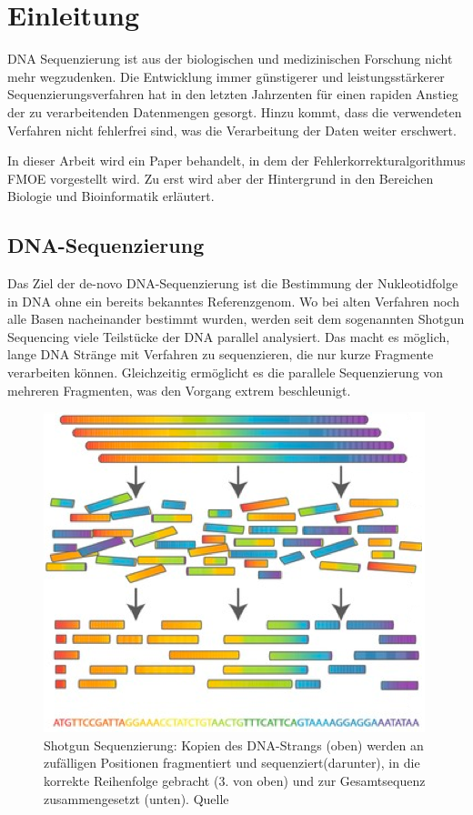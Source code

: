 \chapter{Einleitung}
\label{ch:einleitung}

DNA Sequenzierung ist aus der biologischen und medizinischen Forschung nicht mehr wegzudenken.
Die Entwicklung immer günstigerer und leistungsstärkerer Sequenzierungsverfahren hat in den letzten Jahrzenten für einen rapiden Anstieg der zu verarbeitenden Datenmengen gesorgt.
Hinzu kommt, dass die verwendeten Verfahren nicht fehlerfrei sind, was die Verarbeitung der Daten weiter erschwert.

In dieser Arbeit wird ein Paper \cite{Huang} \cite{Huang2} behandelt, in dem der Fehlerkorrekturalgorithmus FMOE vorgestellt wird.
Zu erst wird aber der Hintergrund in den Bereichen Biologie und Bioinformatik erläutert.

\section{DNA-Sequenzierung}
\label{s:dna-seq} 

Das Ziel der de-novo DNA-Sequenzierung ist die Bestimmung der Nukleotidfolge in DNA ohne ein bereits bekanntes Referenzgenom.
Wo bei alten Verfahren noch alle Basen nacheinander bestimmt wurden, werden seit dem sogenannten Shotgun Sequencing\cite{Staden} \cite{Anderson} viele Teilstücke der DNA parallel analysiert.
Das macht es möglich, lange DNA Stränge mit Verfahren zu sequenzieren, die nur kurze Fragmente verarbeiten können. %
Gleichzeitig ermöglicht es die parallele Sequenzierung von mehreren Fragmenten, was den Vorgang extrem beschleunigt.

\begin{figure}[h]
	\begin{center}
		\includegraphics[width=.5\columnwidth]{./img/shotgun_sequencing.png}
	\end{center}
	\caption{Shotgun Sequenzierung: Kopien des DNA-Strangs (oben) werden an zufälligen Positionen fragmentiert und sequenziert(darunter), in die korrekte Reihenfolge gebracht (3. von oben) und zur Gesamtsequenz zusammengesetzt (unten). Quelle \cite{ShotgunImage}}
	\label{fig:shotgun-sequencing}
\end{figure}

